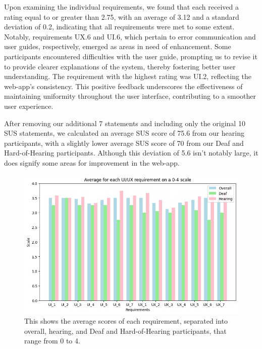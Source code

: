 \documentclass{l4proj}
\begin{document}
Upon examining the individual requirements, we found that each received a rating equal to or greater than 2.75, with an average of 3.12 and a standard deviation of 0.2, indicating that all requirements were met to some extent. Notably, requirements UX.6 and UI.6, which pertain to error communication and user guides, respectively, emerged as areas in need of enhancement. Some participants encountered difficulties with the user guide, prompting us to revise it to provide clearer explanations of the system, thereby fostering better user understanding. The requirement with the highest rating was UI.2, reflecting the web-app's consistency. This positive feedback underscores the effectiveness of maintaining uniformity throughout the user interface, contributing to a smoother user experience.

After removing our additional 7 statements and including only the original 10 SUS statements, we calculated an average SUS score of 75.6 from our hearing participants, with a slightly lower average SUS score of 70 from our Deaf and Hard-of-Hearing participants. Although this deviation of 5.6 isn't notably large, it does signify some areas for improvement in the web-app.

\begin{figure}
    \centering
    \includegraphics[width=0.75\linewidth]{dissertation/images/requirements.png}    
    \caption{This shows the average scores of each requirement, separated into overall, hearing, and Deaf and Hard-of-Hearing participants, that range from 0 to 4.}
    \label{fig:requirements}
\end{figure}

\end{document}
